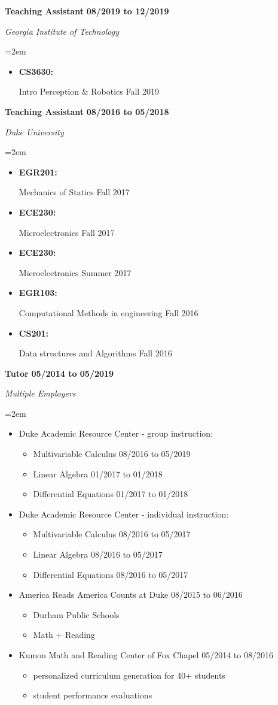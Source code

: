 \documentclass[paper=letter,fontsize=11pt]{scrartcl} %
\newcommand{\sepspace}{\vspace*{0em}}		%
\newcommand{\EducationEntry}[4]{
		\noindent \textbf{#1} \hfill      %
		\colorbox{White}{%
			\bf 
			\parbox{10em}{%
			\hfill\color{Black}#2}} \par  %
		\noindent \textit{#3} \par        %
		\noindent\hangindent=2em\hangafter=0 \small #4 %
		\normalsize \par}
\newcommand{\WorkEntry}[4]{				  %
		\noindent \textbf{#1} \hfill      %
		\colorbox{White}{\bf \color{Black}#2} \par  %
		\noindent \textit{#3} \par              %
		\noindent\hangindent=2em\hangafter=0 \small #4 %
		\normalsize \par}
\begin{document}
\sepspace
\WorkEntry{Teaching Assistant}{08/2019 to 12/2019}{Georgia Institute of Technology}
{
	\begin{itemize}
		\item \parbox[t]{4.5em}{\bf CS3630:} Intro Perception \& Robotics \hfill Fall 2019
	\end{itemize}
}

\sepspace
\WorkEntry{Teaching Assistant}{08/2016 to 05/2018}{Duke University}
{
	\begin{itemize}
		\item \parbox[t]{4.5em}{\bf EGR201:} Mechanics of Statics \hfill Fall 2017
		\item \parbox[t]{4.5em}{\bf ECE230:} Microelectronics	\hfill Fall 2017
		\item \parbox[t]{4.5em}{\bf ECE230:} Microelectronics	\hfill Summer 2017
		\item \parbox[t]{4.5em}{\bf EGR103:} Computational Methods in engineering 	\hfill Fall 2016
		\item \parbox[t]{4.5em}{\bf CS201: } Data structures and Algorithms 	\hfill Fall 2016
	\end{itemize}
}

\sepspace
\WorkEntry{Tutor}{05/2014 to 05/2019}{Multiple Employers}
{	
	\begin{itemize}
	\setlength\itemsep{0em}
	\item Duke Academic Resource Center - group instruction:
		\begin{itemize}
			  \setlength\itemsep{0em}
			\item Multivariable Calculus \hfill 08/2016 to 05/2019
			\item Linear Algebra 		 \hfill 01/2017 to 01/2018
			\item Differential Equations \hfill 01/2017 to 01/2018
		\end{itemize}
	\item Duke Academic Resource Center - individual instruction:
		\begin{itemize}
			  \setlength\itemsep{0em}
			\item Multivariable Calculus \hfill 08/2016 to 05/2017
			\item Linear Algebra 		 \hfill 08/2016 to 05/2017
			\item Differential Equations \hfill 08/2016 to 05/2017
		\end{itemize}
	\item America Reads America Counts at Duke \hfill 08/2015 to 06/2016
		\begin{itemize}
			\item Durham Public Schools
			\item Math + Reading
		\end{itemize}
	\item Kumon Math and Reading Center of Fox Chapel \hfill 05/2014 to 08/2016
		\begin{itemize}
			\item personalized curriculum generation for 40+ students
			\item student performance evaluations
		\end{itemize}
	\end{itemize}
}
\end{document}
